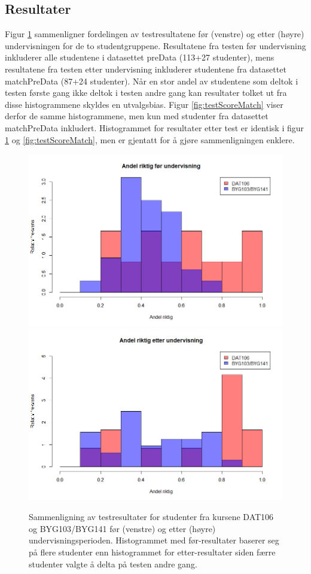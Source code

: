 \documentclass[a4paper,norsk,12pt]{article}
\begin{document}
\subsection{Resultater}
Figur \ref{fig:testScore} sammenligner fordelingen av testresultatene før (venstre) og etter (høyre) undervisningen for de to studentgruppene. Resultatene fra testen før undervisning inkluderer alle studentene i datasettet preData (113+27 studenter), mens resultatene fra testen etter undervisning inkluderer studentene fra datasettet matchPreData (87+24 studenter). Når en stor andel av studentene som deltok i testen første gang ikke deltok i testen andre gang kan resultater tolket ut fra disse histogrammene skyldes en utvalgsbias. Figur \ref{fig:testScoreMatch} viser derfor de samme histogrammene, men kun med studenter fra datasettet matchPreData inkludert. Histogrammet for resultater etter test er identisk i figur \ref{fig:testScore} og \ref{fig:testScoreMatch}, men er gjentatt for å gjøre sammenligningen enklere.
\begin{figure}[tp]
	\includegraphics[width=.48\textwidth]{./preScoreAll}
	\includegraphics[width=.48\textwidth]{./postScore}
	\caption{Sammenligning av testresultater for studenter fra kursene DAT106 og  BYG103/BYG141 før (venstre) og etter (høyre) undervisningsperioden. Histogrammet med før-resultater 
baserer seg på flere studenter enn histogrammet for etter-resultater siden færre studenter valgte å delta på testen andre gang.}
	\label{fig:testScore}
\end{figure}
\end{document}
